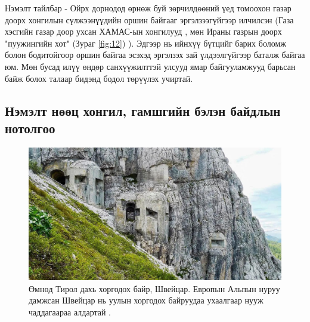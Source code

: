 \documentclass[10pt,twocolumn,letterpaper]{article}
\begin{document}
Нэмэлт тайлбар - Ойрх дорнодод өрнөж буй зөрчилдөөний үед томоохон газар доорх хонгилын сүлжээнүүдийн оршин байгааг эргэлзээгүйгээр илчилсэн (Газа хэсгийн газар доор ухсан ХАМАС-ын хонгилууд \cite{38}, мөн Ираны газрын доорх "пуужингийн хот" (Зураг \ref{fig:12}) \cite{39,40}). Эдгээр нь ийнхүү бүтцийг барих боломж болон бодитойгоор оршин байгаа эсэхэд эргэлзэх зай үлдээлгүйгээр баталж байгаа юм. Мөн бусад илүү өндөр санхүүжилттэй улсууд ямар байгууламжууд барьсан байж болох талаар бидэнд бодол төрүүлэх учиртай.

\subsection{Нэмэлт нөөц хонгил, гамшгийн бэлэн байдлын нотолгоо}

\begin{figure}[t]
\begin{center}
\includegraphics[width=1\linewidth]{tyrol.jpg}
\end{center}
\caption{Өмнөд Тирол дахь хоргодох байр, Швейцар. Европын Альпын нуруу дамжсан Швейцар нь уулын хоргодох байруудаа ухаалгаар нууж чаддагаараа алдартай \cite{32}.}
\label{fig:7}
\label{fig:onecol}
\end{figure}
\end{document}
